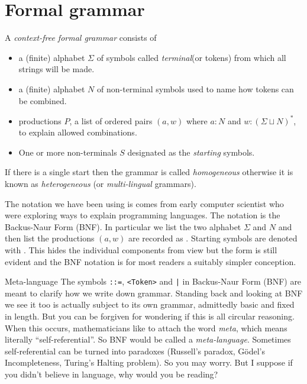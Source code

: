

\section{Formal grammar}
A \emph{context-free formal grammar} consists of 
\begin{itemize}
    \item {} a (finite) alphabet $\Sigma$ 
    of symbols called \emph{terminal}(or tokens) from which all strings will be made.
    \item {} a (finite) alphabet $N$ of non-terminal symbols
    used to name how tokens can be combined.
    \item {} productions $P$, a list of ordered pairs 
    $(a,w)$ where $a:N$ and $w:(\Sigma\sqcup N)^*$, to explain allowed 
    combinations.
    \item One or more non-terminals $S$ designated as the \emph{starting}
    symbols.
\end{itemize}
If there is a single start then the grammar is called \emph{homogeneous}
otherwise it is known as \emph{heterogeneous} (or \emph{multi-lingual} grammars).

The notation we have been using is comes from early computer
scientist who were exploring ways to explain programming languages. The notation
 is the Backus-Naur Form (BNF). In
particular we list the two alphabet $\Sigma$ and $N$ and then list the
productions $(a,w)$ are recorded as .  Starting symbols are
denoted with .  This hides the individual components from 
view but the form is still evident and the BNF notation is for most readers 
a suitably simpler conception.



\begin{remark}{Meta-language}
    The symbols \lstinline{::=}, \lstinline{<Token>} and \lstinline{|} in
    Backus-Naur Form (BNF) are meant to clarify how we write down grammar.
    Standing back and looking at BNF we see  it too is actually subject to its
    own grammar, admittedly basic and fixed in length.  But you can be forgiven
    for wondering if this is all circular reasoning.  When this occurs,
    mathematicians like to attach the word \emph{meta}, which means literally
    ``self-referential''. So BNF would be called a \emph{meta-language}.
    Sometimes self-referential can be turned into paradoxes (Russell's paradox,
    G\"odel's Incompleteness, Turing's Halting problem).  So you may worry.  But
    I suppose if you didn't believe in language, why would you be reading?\\
\end{remark}


